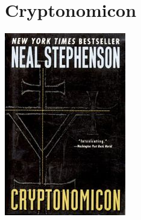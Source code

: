 \documentclass{tufte-handout}
\makeatletter
\newcommand{\varcaption}[2][0pt]{%
  \gsetlength{\@tufte@caption@vertical@offset}{-#1}%
  \gdef\@tufte@stored@varcaption{#2}%
}
\gdef\@tufte@stored@varcaption{} %
\makeatother
\begin{document}
\section*{Cryptonomicon}
\begin{marginfigure}[14\baselineskip]
   \includegraphics[width=\linewidth]{images/cryptonomicon.jpg}
   \varcaption{\href{https://www.harpercollins.com/9780380788620/cryptonomicon/}{Publisher Link}, \href{https://www.amazon.com/Cryptonomicon-Neal-Stephenson/dp/0380788624/}{Amazon Link}}
\end{marginfigure}
\end{document}
